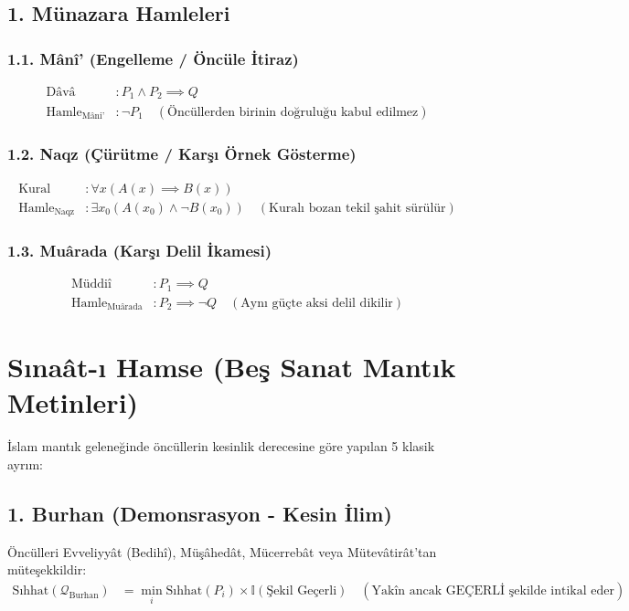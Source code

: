 \documentclass[11pt, a4paper]{article}
\begin{document}
\subsection{1. Münazara Hamleleri}

\subsubsection{1.1. Mânî' (Engelleme / Öncüle İtiraz)}
\begin{align}
\text{Dâvâ} &: P_1 \land P_2 \implies Q \\
\text{Hamle}_{\text{Mâni'}} &: \neg P_1 \quad (\text{Öncüllerden birinin doğruluğu kabul edilmez})
\end{align}

\subsubsection{1.2. Naqz (Çürütme / Karşı Örnek Gösterme)}
\begin{align}
\text{Kural} &: \forall x (A(x) \implies B(x)) \\
\text{Hamle}_{\text{Naqz}} &: \exists x_0 (A(x_0) \land \neg B(x_0)) \quad (\text{Kuralı bozan tekil şahit sürülür})
\end{align}

\subsubsection{1.3. Muârada (Karşı Delil İkamesi)}
\begin{align}
\text{Müddiî} &: P_1 \implies Q \\
\text{Hamle}_{\text{Muârada}} &: P_2 \implies \neg Q \quad (\text{Aynı güçte aksi delil dikilir})
\end{align}

\section{Sınaât-ı Hamse (Beş Sanat Mantık Metinleri)}

İslam mantık geleneğinde öncüllerin kesinlik derecesine göre yapılan 5 klasik ayrım:

\subsection{1. Burhan (Demonsrasyon - Kesin İlim)}
Öncülleri Evveliyyât (Bedihî), Müşâhedât, Mücerrebât veya Mütevâtirât'tan müteşekkildir:
\begin{align}
\text{Sıhhat}(\mathcal{Q}_{\text{Burhan}}) &= \min_i \text{Sıhhat}(P_i) \times \mathbb{I}(\text{Şekil Geçerli}) \quad (\text{Yakîn ancak GEÇERLİ şekilde intikal eder})
\end{align}
\end{document}
